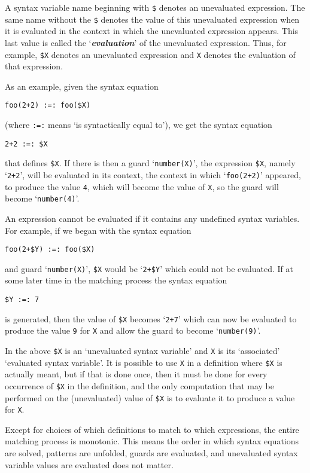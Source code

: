\documentclass[12pt]{article}
\makeatletter
\newcommand{\key}[1]{{\bf \em #1}\index{#1}}
\newcommand{\ttmnbkey}[2]{{\tt #1}\index{#1@{\tt #1}!#2}}
\makeatother
\begin{document}
A syntax variable name beginning with
\ttmnbkey{\$}{in syntax variable name} denotes an unevaluated
expression.  The same name without the \verb|$| denotes the value
of this unevaluated expression when it is evaluated
in the context in which the unevaluated expression appears.
This last value is called the `\key{evaluation}' of the unevaluated
expression.  Thus, for example, \verb|$X| denotes an unevaluated
expression and \verb|X| denotes the evaluation of that expression.

As an example, given the syntax equation
\begin{center}
\verb|foo(2+2) :=: foo($X)|
\end{center}
(where \verb|:=:| means `is syntactically equal to'), we get
the syntax equation
\begin{center}
\verb|2+2 :=: $X|
\end{center}
that defines \verb|$X|.  If there is then a guard `\verb|number(X)|',
the expression \verb|$X|, namely `\verb|2+2|',
will be evaluated in its context, the context in which `\verb|foo(2+2)|'
appeared, to produce the value \verb|4|, which will become the value of
\verb|X|, so the guard will become `\verb|number(4)|'.

An expression cannot be evaluated if it contains any undefined syntax
variables.  For example, if we began with the syntax equation
\begin{center}
\verb|foo(2+$Y) :=: foo($X)|
\end{center}
and guard `\verb|number(X)|', \verb|$X| would be `\verb|2+$Y|' which
could not be evaluated.  If at some later time in the matching process
the syntax equation
\begin{center}
\verb|$Y :=: 7|
\end{center}
is generated, then the value of \verb|$X| becomes `\verb|2+7|'
which can now be evaluated to produce the value \verb|9| for \verb|X|
and allow the guard to become `\verb|number(9)|'.

In the above \verb|$X| is an `unevaluated syntax variable' and
\verb|X| is its `associated' `evaluated syntax variable'.  It is
possible to use \verb|X| in a definition where \verb|$X| is actually
meant, but if that is done once, then it must be done for every occurrence
of \verb|$X| in the definition, and the only computation that may be
performed on the (unevaluated) value of \verb|$X| is to evaluate it to
produce a value for \verb|X|.

Except for choices of which definitions to match to which expressions,
the entire matching process is monotonic.  This means the order in which
syntax equations are solved, patterns are unfolded, guards are evaluated,
and unevaluated syntax variable values are evaluated does not matter.
\end{document}
